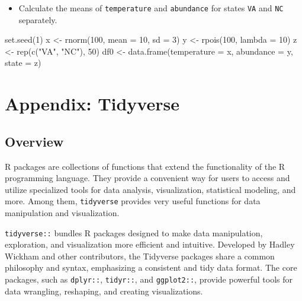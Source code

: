 \documentclass[
]{book}
\newenvironment{Shaded}{\begin{snugshade}}{\end{snugshade}}
\newcommand{\AttributeTok}[1]{\textcolor[rgb]{0.77,0.63,0.00}{#1}}
\newcommand{\DecValTok}[1]{\textcolor[rgb]{0.00,0.00,0.81}{#1}}
\newcommand{\FunctionTok}[1]{\textcolor[rgb]{0.00,0.00,0.00}{#1}}
\newcommand{\NormalTok}[1]{#1}
\newcommand{\OtherTok}[1]{\textcolor[rgb]{0.56,0.35,0.01}{#1}}
\newcommand{\StringTok}[1]{\textcolor[rgb]{0.31,0.60,0.02}{#1}}
\providecommand{\tightlist}{%
  \setlength{\itemsep}{0pt}\setlength{\parskip}{0pt}}
\begin{document}
\begin{itemize}
\tightlist
\item
  Calculate the means of \texttt{temperature} and \texttt{abundance} for states \texttt{VA} and \texttt{NC} separately.
\end{itemize}

\begin{Shaded}
\begin{Highlighting}[]
\FunctionTok{set.seed}\NormalTok{(}\DecValTok{1}\NormalTok{)}
\NormalTok{x }\OtherTok{\textless{}{-}} \FunctionTok{rnorm}\NormalTok{(}\DecValTok{100}\NormalTok{, }\AttributeTok{mean =} \DecValTok{10}\NormalTok{, }\AttributeTok{sd =} \DecValTok{3}\NormalTok{)}
\NormalTok{y }\OtherTok{\textless{}{-}} \FunctionTok{rpois}\NormalTok{(}\DecValTok{100}\NormalTok{, }\AttributeTok{lambda =} \DecValTok{10}\NormalTok{)}
\NormalTok{z }\OtherTok{\textless{}{-}} \FunctionTok{rep}\NormalTok{(}\FunctionTok{c}\NormalTok{(}\StringTok{"VA"}\NormalTok{, }\StringTok{"NC"}\NormalTok{), }\DecValTok{50}\NormalTok{)}
\NormalTok{df0 }\OtherTok{\textless{}{-}} \FunctionTok{data.frame}\NormalTok{(}\AttributeTok{temperature =}\NormalTok{ x, }\AttributeTok{abundance =}\NormalTok{ y, }\AttributeTok{state =}\NormalTok{ z)}
\end{Highlighting}
\end{Shaded}

\hypertarget{appendix-tidyverse}{%
\chapter{Appendix: Tidyverse}\label{appendix-tidyverse}}

\hypertarget{overview-1}{%
\section{Overview}\label{overview-1}}

R packages are collections of functions that extend the functionality of the R programming language. They provide a convenient way for users to access and utilize specialized tools for data analysis, visualization, statistical modeling, and more. Among them, \texttt{tidyverse} provides very useful functions for data manipulation and visualization.

\texttt{tidyverse::} bundles R packages designed to make data manipulation, exploration, and visualization more efficient and intuitive. Developed by Hadley Wickham and other contributors, the Tidyverse packages share a common philosophy and syntax, emphasizing a consistent and tidy data format. The core packages, such as \texttt{dplyr::}, \texttt{tidyr::}, and \texttt{ggplot2::}, provide powerful tools for data wrangling, reshaping, and creating visualizations.
\end{document}
